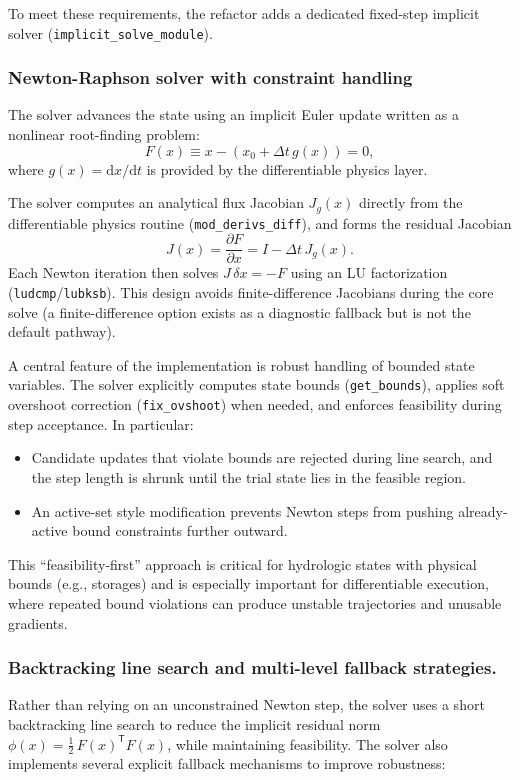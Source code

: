 \documentclass[11pt]{scrartcl}
\begin{document}
To meet these requirements, the refactor adds a dedicated fixed-step implicit solver
(\texttt{implicit\_solve\_module}). 

\subsubsection{Newton-Raphson solver with constraint handling}

The solver advances the state using an implicit Euler
update written as a nonlinear root-finding problem:
\[
F(x) \equiv x - \left(x_0 + \Delta t\, g(x)\right) = 0,
\]
where \(g(x) = \mathrm{d}x/\mathrm{d}t\) is provided by the differentiable physics layer.

The solver computes an analytical flux Jacobian \(J_g(x)\) directly from the differentiable
physics routine (\texttt{mod\_derivs\_diff}), and forms the residual Jacobian
\[
J(x) = \frac{\partial F}{\partial x} = I - \Delta t\, J_g(x).
\]
Each Newton iteration then solves \(J\,\delta x = -F\) using an LU factorization
(\texttt{ludcmp}/\texttt{lubksb}). This design avoids finite-difference Jacobians during the
core solve (a finite-difference option exists as a diagnostic fallback but is not the
default pathway).

A central feature of the implementation is robust handling of bounded state variables.
The solver explicitly computes state bounds (\texttt{get\_bounds}), applies soft
overshoot correction (\texttt{fix\_ovshoot}) when needed, and enforces feasibility during
step acceptance. In particular:

\begin{itemize}
\item Candidate updates that violate bounds are rejected during line search, and the step
      length is shrunk until the trial state lies in the feasible region.
\item An active-set style modification prevents Newton steps from pushing already-active
      bound constraints further outward.
\end{itemize}

This ``feasibility-first'' approach is critical for hydrologic states with physical bounds
(e.g., storages) and is especially important for differentiable execution, where repeated
bound violations can produce unstable trajectories and unusable gradients.

\subsubsection{Backtracking line search and multi-level fallback strategies.}
Rather than relying on an unconstrained Newton step, the solver uses a short backtracking
line search to reduce the implicit residual norm
\(\phi(x) = \tfrac{1}{2}\,F(x)^{\mathsf{T}}F(x)\), while maintaining feasibility. The solver
also implements several explicit fallback mechanisms to improve robustness:
\end{document}
